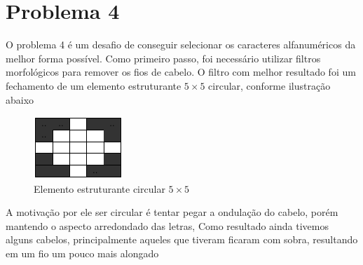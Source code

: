\documentclass{article}
\begin{document}
	\section{Problema 4}
	
	O problema 4 é um desafio de conseguir selecionar os caracteres alfanuméricos da melhor forma possível.
	Como primeiro passo, foi necessário utilizar filtros morfológicos para remover os fios de cabelo. O filtro com melhor resultado foi um fechamento de um elemento estruturante $5 \times 5$ circular, conforme ilustração abaixo
	
	\begin{figure}[H]
		\centering
		\includegraphics[scale=0.7]{images/4_struct.png}
		\caption{Elemento estruturante circular $5 \times 5$}
	\end{figure}
	
	A motivação por ele ser circular é tentar pegar a ondulação do cabelo, porém mantendo o aspecto arredondado das letras, Como resultado ainda tivemos alguns cabelos, principalmente aqueles que tiveram ficaram com sobra, resultando em um fio um pouco mais alongado
	
\end{document}
